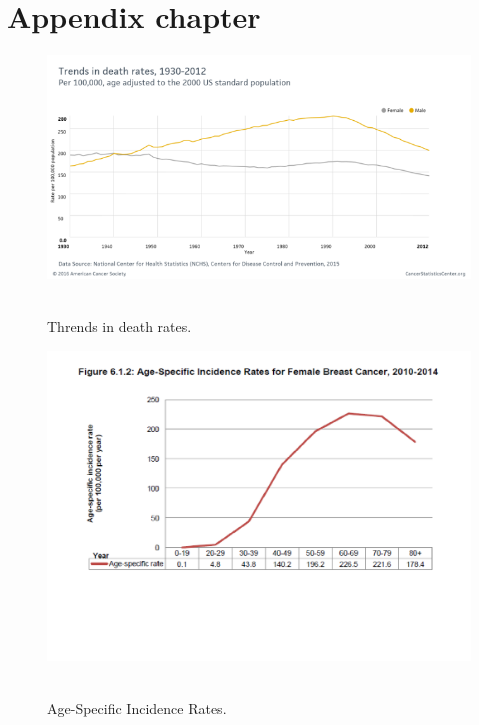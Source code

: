 
\chapter{Appendix chapter}
\label{appendix:appendix_chapter}

\begin{figure}[!hbt]
\centering
\includegraphics[width=15cm]{images/acspc-047104}~\\
\caption{\label{fig:screenshot}Thrends in death rates.
}
\end{figure}

\begin{figure}[!hbt]
\centering
\includegraphics[width=15cm]{images/proper-2}~\\
\caption{\label{fig:screenshot}Age-Specific Incidence Rates.
}
\end{figure}

